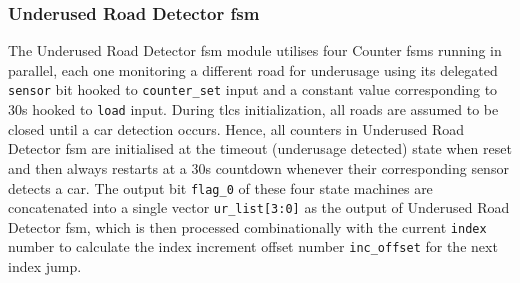 \subsubsection{Underused Road Detector \acs{fsm}}
The Underused Road Detector \ac{fsm} module utilises four Counter \ac{fsm}s running in parallel, each one monitoring a different road for underusage using its delegated \texttt{sensor} bit hooked to \texttt{counter\_set} input and a constant value corresponding to 30\si{\second} hooked to \texttt{load} input. During \ac{tlcs} initialization, all roads are assumed to be closed until a car detection occurs. Hence, all counters in Underused Road Detector \ac{fsm} are initialised at the timeout (underusage detected) state when reset and then always restarts at a 30\unit{\second} countdown whenever their corresponding sensor detects a car. The output bit \texttt{flag\_0} of these four state machines are concatenated into a single vector \texttt{ur\_list[3:0]} as the output of Underused Road Detector \ac{fsm}, which is then processed combinationally with the current \texttt{index} number to calculate the index increment offset number \texttt{inc\_offset} for the next index jump.




